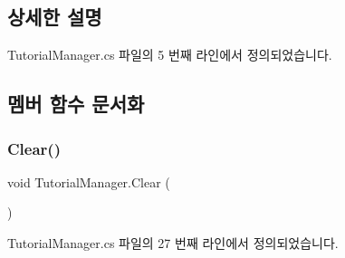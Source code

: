 \subsection{상세한 설명}


Tutorial\+Manager.\+cs 파일의 5 번째 라인에서 정의되었습니다.



\subsection{멤버 함수 문서화}
\mbox{\label{class_tutorial_manager_ad25e4771d3c09099d066991bca8c1203}} 
\subsubsection{\texorpdfstring{Clear()}{Clear()}}
{\footnotesize\ttfamily void Tutorial\+Manager.\+Clear (\begin{DoxyParamCaption}{ }\end{DoxyParamCaption})}



Tutorial\+Manager.\+cs 파일의 27 번째 라인에서 정의되었습니다.


